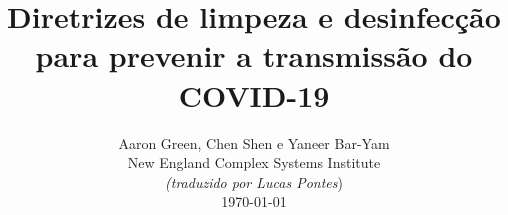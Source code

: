 \documentclass[onecolumn,journal]{IEEEtran}
\begin{document}
\title{\color{Brown}  Diretrizes de limpeza e desinfecção para prevenir a transmissão do COVID-19
\vspace{-0.35ex}}
\author{Aaron Green, Chen Shen e Yaneer Bar-Yam \\ New England Complex Systems Institute \\
\vspace{+0.35ex}
\small{\textit{(traduzido por Lucas Pontes})}\\
 \today
  \vspace{-8ex} \\
\textbf{}
 }

\maketitle




\thispagestyle{empty} %




\end{document}
